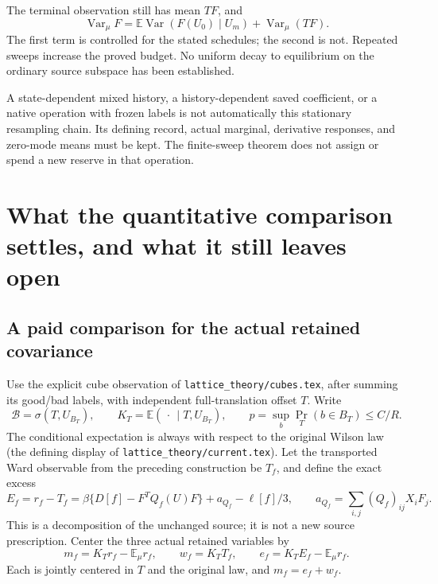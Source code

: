 \documentclass[11pt]{article}
\theoremstyle{definition}\newtheorem{definition}[theorem]{Definition}
\theoremstyle{remark}\newtheorem{remark}[theorem]{Remark}
\newcommand{\E}{\mathbb E}\newcommand{\Var}{\operatorname{Var}}
\begin{document}
The terminal observation still has mean \(TF\), and
\[
 \Var_\mu F
 =\E\Var(F(U_0)\mid U_m)+\Var_\mu(TF).
\]
The first term is controlled for the stated schedules; the second is not. Repeated sweeps increase the proved budget. No uniform decay to equilibrium on the ordinary source subspace has been established.

A state-dependent mixed history, a history-dependent saved coefficient, or a native operation with frozen labels is not automatically this stationary resampling chain. Its defining record, actual marginal, derivative responses, and zero-mode means must be kept. The finite-sweep theorem does not assign or spend a new reserve in that operation.


\section{What the quantitative comparison settles, and what it still leaves open}
\label{sc:closing}

\subsection{A paid comparison for the actual retained covariance}

Use the explicit cube observation of \texttt{lattice\_theory/cubes.tex}, after summing its good/bad labels, with independent full-translation offset \(T\). Write
\[
 \mathcal B=\sigma(T,U_{B_T}),\qquad K_T=\E(\,\cdot\,\mid T,U_{B_T}),
 \qquad p=\sup_b\Pr_T(b\in B_T)\le C/R .
\]
The conditional expectation is always with respect to the original Wilson law (the defining display of \texttt{lattice\_theory/current.tex}). Let the transported Ward observable from the preceding construction be \(T_f\), and define the exact excess
\begin{equation}
 E_f=r_f-T_f
  =\beta\{D[f]-F^TQ_f(U)F\}+a_{Q_f}-\ell[f]/3,\qquad
 a_{Q_f}=\sum_{i,j}(Q_f)_{ij}X_iF_j .
 \label{sc:excess}
\end{equation}
This is a decomposition of the unchanged source; it is not a new source prescription.
Center the three actual retained variables by
\[
 m_f=K_Tr_f-\E_\mu r_f,\qquad
 w_f=K_TT_f,\qquad
 e_f=K_TE_f-\E_\mu r_f .
\]
Each is jointly centered in \(T\) and the original law, and \(m_f=e_f+w_f\).
\end{document}

